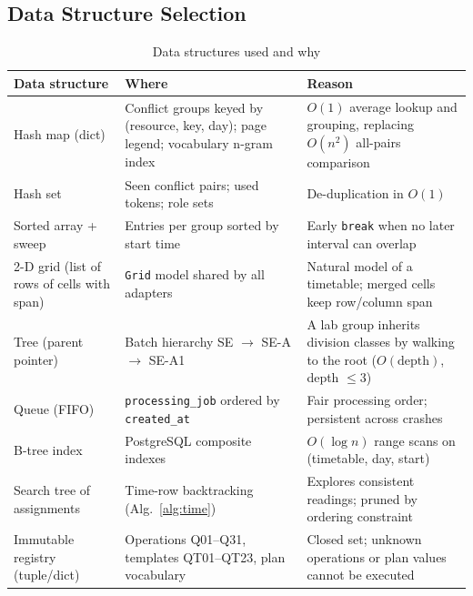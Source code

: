 \subsection{Data Structure Selection}
\begin{table}[H]
\centering
\caption{Data structures used and why}
\label{tab:ds}
\small
\begin{tabularx}{\textwidth}{@{}p{3.2cm}p{4.3cm}X@{}}
\toprule
\textbf{Data structure} & \textbf{Where} & \textbf{Reason}\\
\midrule
Hash map (dict) & Conflict groups keyed by (resource, key, day); page legend; vocabulary n-gram index & $O(1)$ average lookup and grouping, replacing $O(n^2)$ all-pairs comparison\\
Hash set & Seen conflict pairs; used tokens; role sets & De-duplication in $O(1)$\\
Sorted array + sweep & Entries per group sorted by start time & Early \texttt{break} when no later interval can overlap\\
2-D grid (list of rows of cells with span) & \texttt{Grid} model shared by all adapters & Natural model of a timetable; merged cells keep row/column span\\
Tree (parent pointer) & Batch hierarchy SE $\rightarrow$ SE-A $\rightarrow$ SE-A1 & A lab group inherits division classes by walking to the root ($O(\text{depth})$, depth $\le 3$)\\
Queue (FIFO) & \texttt{processing\_job} ordered by \texttt{created\_at} & Fair processing order; persistent across crashes\\
B-tree index & PostgreSQL composite indexes & $O(\log n)$ range scans on (timetable, day, start)\\
Search tree of assignments & Time-row backtracking (Alg.~\ref{alg:time}) & Explores consistent readings; pruned by ordering constraint\\
Immutable registry (tuple/dict) & Operations Q01--Q31, templates QT01--QT23, plan vocabulary & Closed set; unknown operations or plan values cannot be executed\\
\bottomrule
\end{tabularx}
\end{table}

